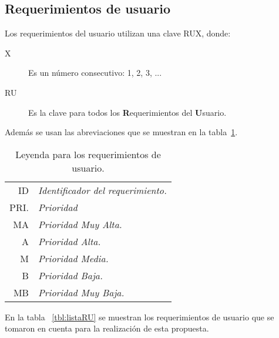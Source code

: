 \subsection{Requerimientos de usuario}
Los requerimientos del usuario utilizan una clave RUX, donde:

\begin{description}
        \item[X] Es un número consecutivo: 1, 2, 3, ...
        \item[RU] Es la clave para todos los {\bf R}equerimientos del {\bf U}suario.
\end{description}
\newpage
Además se usan las abreviaciones que se muestran en la tabla~\ref{tbl:leyendaRU}.
\begin{table}[hbtp!]
        \begin{center}
    \begin{tabular}{|r l|}
            \hline
        {\footnotesize ID} & {\footnotesize\em Identificador del requerimiento.}\\
        {\footnotesize PRI.} & {\footnotesize\em Prioridad}\\
        {\footnotesize MA} & {\footnotesize\em Prioridad Muy Alta.}\\
        {\footnotesize A} & {\footnotesize\em Prioridad Alta.}\\
        {\footnotesize M} & {\footnotesize\em Prioridad Media.}\\
        {\footnotesize B} & {\footnotesize\em Prioridad Baja.}\\
        {\footnotesize MB} & {\footnotesize\em Prioridad Muy Baja.}\\
                \hline
    \end{tabular} 
    \caption{Leyenda para los requerimientos de usuario.}
    \label{tbl:leyendaRU}
        \end{center}
\end{table}

En la tabla ~\ref{tbl:listaRU} se muestran los requerimientos de usuario que se tomaron en cuenta para la realización de esta propuesta.

